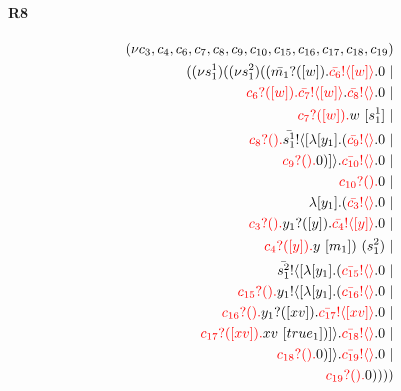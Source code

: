 \documentclass{article}
\begin{document}
\paragraph{R8}
\begin{align*}
 (\nu c_{3},c_{4},c_{6},c_{7},c_{8},c_{9},c_{10},c_{15},c_{16},c_{17},c_{18},c_{19}) \\ ( (\nu s^{1}_{1})( (\nu s^{2}_{1})((\color{black}\bar{m_{1}}?([w]).\color{black}\color{red}\bar{c_{6}}! \langle [w] \rangle \color{black}.0  \ | \\ \color{red}c_{6}?([w]).\color{black}\color{red}\bar{c_{7}}! \langle [w] \rangle \color{black}.\color{red}\bar{c_{8}}! \langle  \rangle \color{black}.0  \ | \\ \color{red}c_{7}?([w]).\color{black}w \ [s^{1}_{1}] \ | \\ \color{red}c_{8}?().\color{black}\color{black}\bar{s^{1}_{1}}! \langle [ \lambda [y_{1}].(\color{red}\bar{c_{9}}! \langle  \rangle \color{black}.0  \ | \\ \color{red}c_{9}?().\color{black}0 )] \rangle \color{black}.\color{red}\bar{c_{10}}! \langle  \rangle \color{black}.0  \ | \\ \color{red}c_{10}?().\color{black}0  \ | \\  \lambda [y_{1}].(\color{red}\bar{c_{3}}! \langle  \rangle \color{black}.0  \ | \\ \color{red}c_{3}?().\color{black}\color{black}y_{1}?([y]).\color{black}\color{red}\bar{c_{4}}! \langle [y] \rangle \color{black}.0  \ | \\ \color{red}c_{4}?([y]).\color{black}y \ [m_{1}]) \ (s^{2}_{1}) \ | \\ \color{black}\bar{s^{2}_{1}}! \langle [ \lambda [y_{1}].(\color{red}\bar{c_{15}}! \langle  \rangle \color{black}.0  \ | \\ \color{red}c_{15}?().\color{black}\color{black}y_{1}! \langle [ \lambda [y_{1}].(\color{red}\bar{c_{16}}! \langle  \rangle \color{black}.0  \ | \\ \color{red}c_{16}?().\color{black}\color{black}y_{1}?([xv]).\color{black}\color{red}\bar{c_{17}}! \langle [xv] \rangle \color{black}.0  \ | \\ \color{red}c_{17}?([xv]).\color{black}xv \ [true_{1}])] \rangle \color{black}.\color{red}\bar{c_{18}}! \langle  \rangle \color{black}.0  \ | \\ \color{red}c_{18}?().\color{black}0 )] \rangle \color{black}.\color{red}\bar{c_{19}}! \langle  \rangle \color{black}.0  \ | \\ \color{red}c_{19}?().\color{black}0 ))))
\end{align*}
\end{document}
